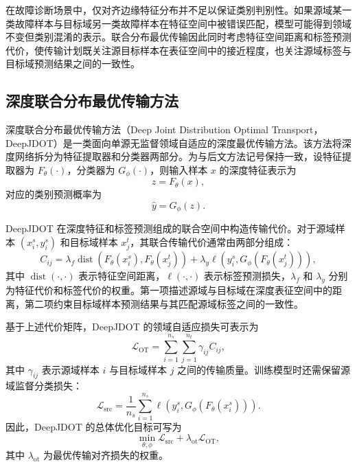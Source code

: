 \documentclass{seuthesis-2022}
\begin{document}
在故障诊断场景中，仅对齐边缘特征分布并不足以保证类别判别性。如果源域某一类故障样本与目标域另一类故障样本在特征空间中被错误匹配，模型可能得到领域不变但类别混淆的表示。联合分布最优传输因此同时考虑特征空间距离和标签预测代价，使传输计划既关注源目标样本在表征空间中的接近程度，也关注源域标签与目标域预测结果之间的一致性\cite{courty2017jdot}。

\subsection{深度联合分布最优传输方法}

深度联合分布最优传输方法（Deep Joint Distribution Optimal Transport，DeepJDOT）是一类面向单源无监督领域自适应的深度最优传输方法\cite{damodaran2018deepjdot}。该方法将深度网络拆分为特征提取器和分类器两部分。为与后文方法记号保持一致，设特征提取器为 $F_\theta(\cdot)$，分类器为 $G_\phi(\cdot)$，则输入样本 $x$ 的深度特征表示为
\begin{equation}
    z = F_\theta(x),
\end{equation}
对应的类别预测概率为
\begin{equation}
    \hat{y} = G_\phi(z).
\end{equation}

DeepJDOT 在深度特征和标签预测组成的联合空间中构造传输代价。对于源域样本 $(x_i^s,y_i^s)$ 和目标域样本 $x_j^t$，其联合传输代价通常由两部分组成：
\begin{equation}
    C_{ij}
    =
    \lambda_f \operatorname{dist}\left(F_\theta(x_i^s), F_\theta(x_j^t)\right)
    +
    \lambda_y \ell\left(y_i^s, G_\phi(F_\theta(x_j^t))\right),
\end{equation}
其中 $\operatorname{dist}(\cdot,\cdot)$ 表示特征空间距离，$\ell(\cdot,\cdot)$ 表示标签预测损失，$\lambda_f$ 和 $\lambda_y$ 分别为特征代价和标签代价的权重。第一项描述源域与目标域在深度表征空间中的距离，第二项约束目标域样本预测结果与其匹配源域标签之间的一致性。

基于上述代价矩阵，DeepJDOT 的领域自适应损失可表示为
\begin{equation}
    \mathcal{L}_{\mathrm{OT}}
    =
    \sum_{i=1}^{n_s}\sum_{j=1}^{n_t}
    \gamma_{ij} C_{ij},
\end{equation}
其中 $\gamma_{ij}$ 表示源域样本 $i$ 与目标域样本 $j$ 之间的传输质量。训练模型时还需保留源域监督分类损失：
\begin{equation}
    \mathcal{L}_{\mathrm{src}}
    =
    \frac{1}{n_s}
    \sum_{i=1}^{n_s}
    \ell\left(y_i^s,G_\phi(F_\theta(x_i^s))\right).
\end{equation}
因此，DeepJDOT 的总体优化目标可写为
\begin{equation}
    \min_{\theta,\phi}
    \mathcal{L}_{\mathrm{src}}
    +
    \lambda_{\mathrm{ot}}\mathcal{L}_{\mathrm{OT}},
\end{equation}
其中 $\lambda_{\mathrm{ot}}$ 为最优传输对齐损失的权重。
\end{document}
